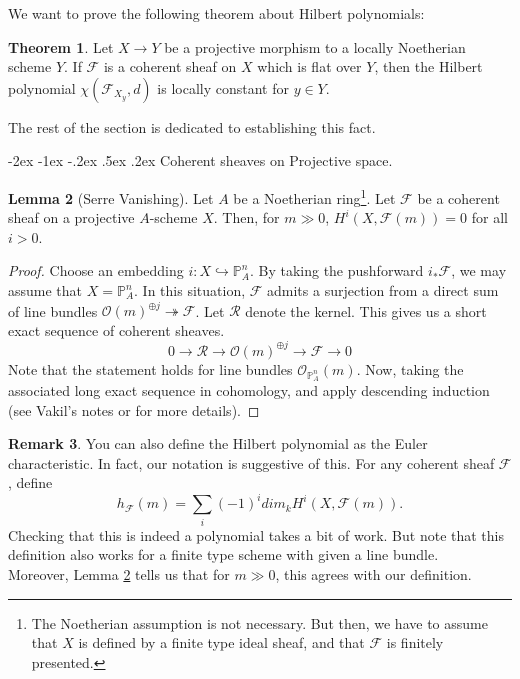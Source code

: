 \documentclass[11pt]{amsart}
\makeatletter
\renewcommand\subsection{\@startsection {subsection}{1}{\z@}%
	{-2ex \@plus -1ex \@minus -.2ex}%
	{.5ex \@plus.2ex}%
	{\normalfont\bfseries}}
\newcommand{\sF}{{\mathcal F}}
\newcommand{\sO}{{\mathcal O}}
\newcommand{\sR}{{\mathcal R}}
\renewcommand{\P}{{\mathbb P}}
\theoremstyle{definition}
\newtheorem{theorem}{Theorem}[section]
\newtheorem{lemma}[theorem]{Lemma}
\newtheorem{remark}[theorem]{Remark}
\makeatother
\begin{document}
We want to prove the following theorem about Hilbert polynomials:

\begin{theorem}
	\label{theorem-hilbert-polynomial-in-flat-family}
	Let $X\rightarrow Y$ be a projective morphism to a locally Noetherian scheme $Y$. If $\sF$ is a coherent sheaf on $X$ which is flat over $Y$, then the Hilbert polynomial $\chi(\sF_{X_y},d)$ is locally constant for $y\in Y$.
\end{theorem}

The rest of the section is dedicated to establishing this fact.


\subsection{Coherent sheaves on Projective space.}

\begin{lemma}[Serre Vanishing]
	\label{lemma-serre-vanishing}
	Let $A$ be a Noetherian ring\footnote{The Noetherian assumption is not necessary. But then, we have to assume that $X$ is defined by a finite type ideal sheaf, and that $\sF$ is finitely presented.}. Let $\sF$ be a coherent sheaf on a projective $A$-scheme $X$. Then, for $m\gg 0$, $H^i(X,\sF(m))=0$ for all $i>0$.
\end{lemma}
\begin{proof}
	Choose an embedding $i:X\hookrightarrow \P_A^n$. By taking the pushforward $i_*\sF$, we may assume that $X=\P_A^n$. In this situation, $\sF$ admits a surjection from a direct sum of line bundles $\sO(m)^{\oplus j}\twoheadrightarrow \sF$. Let $\sR$ denote the kernel. This gives us a short exact sequence of coherent sheaves. 
	\[0\rightarrow \sR \rightarrow\sO(m)^{\oplus j}\rightarrow \sF\rightarrow 0\]
	Note that the statement holds for line bundles $\sO_{\P_A^n}(m)$. Now, taking the associated long exact sequence in cohomology, and apply descending induction (see Vakil's notes or \cite[III, 5.2]{Hart1} for more details).
\end{proof}


\begin{remark}
	You can also define the Hilbert polynomial as the Euler characteristic. In fact, our notation is suggestive of this. For any coherent sheaf $\sF$, define
	\[h_{\sF}(m)= \sum_i (-1)^i dim_k H^i(X,\sF(m)).\]
	Checking that this is indeed a polynomial takes a bit of work. But note that this definition also works for a finite type scheme with given a line bundle.\\
	Moreover, Lemma \ref{lemma-serre-vanishing} tells us that for $m\gg 0$, this agrees with our definition.
\end{remark}
\end{document}
